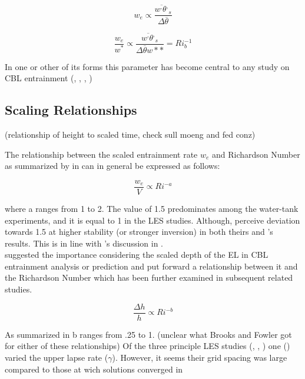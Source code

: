 \begin{equation}
w_{e} \propto \frac{\overline{w^{,}\theta^{,}}_{s}}{\Delta \overline{\theta}}
\end{equation}

\begin{equation}
\frac{w_{e}}{w^{*}} \propto  \frac{\overline{w^{,}\theta^{,}}_{s}}{\Delta \overline{\theta} w*{*}} = Ri_{b}^{-1}
\end{equation}
 

In one or other of its forms this parameter has become central to any study on \acs{CBL} entrainment (\cite{SullMoengStev}, \cite{FedConzMir04}, \cite{Traum11}, \cite{BrooksFowler2})

\subsection{Scaling Relationships}

(relationship of height to scaled time, check sull moeng and fed conz)

The relationship between the scaled entrainment rate $w_{e}$ and Richardson Number as summarized by \citeauthor{Traum11} in 
\cite{Traum11} can in general be expressed as follows:

\begin{equation}
\frac{w_{e}}{V} \propto Ri^{-a}
\end{equation}

where a ranges from 1 to 2.  The value of 1.5 predominates among the water-tank experiments, and 
it is equal to 1 in the \acs{LES} studies.  Although, \citeauthor{FedConzMir04} perceive deviation
towards 1.5 at higher stability (or stronger inversion) in both theirs and \citeauthor{SullMoengStev}'s 
results.  This is in line with \citeauthor{Turner86}'s discussion in \cite{Turner86}.\\

\citeauthor{DearWill80} suggested the importance considering the scaled depth of the \acs{EL} in \acs{CBL} 
entrainment analysis or prediction and put forward a relationship between it and the Richardson Number
which has been further examined in subsequent related studies.  

\begin{equation}
\frac{\Delta h}{h} \propto Ri^{-b}
\end{equation}   

As summarized in \cite{Traum11} b ranges from .25 to 1.  (unclear what Brooks and Fowler got for either of these
relationships) Of the three principle \acs{LES} studies (\cite{BrooksFowler2}, \cite{FedConzMir04}, \cite{SullMoengStev})
one (\cite{FedConzMir04}) varied the upper lapse rate ($\gamma$).  However, it seems their grid spacing 
was large compared to those at wich solutions converged in \cite{SullPat}


